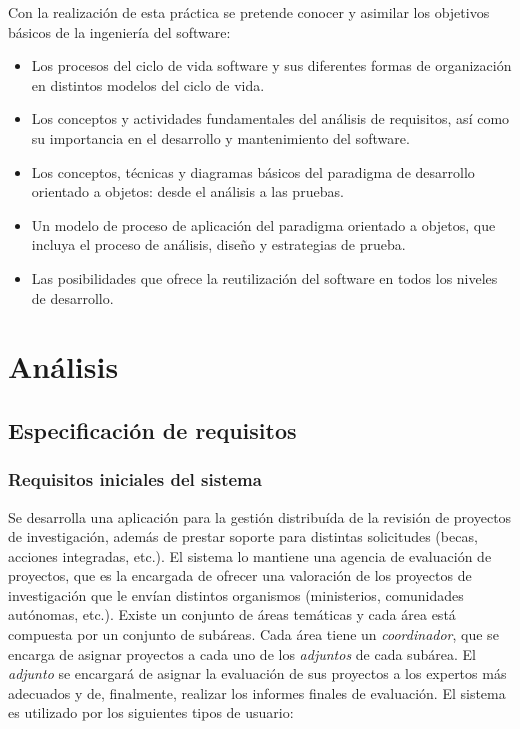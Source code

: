 \documentclass[11pt,a4paper,spanish,twoside]{book}
\begin{document}
Con la realización de esta práctica se pretende conocer y asimilar los
objetivos básicos de la ingeniería del software: 
\begin{itemize}
\item Los procesos del ciclo de vida software y sus diferentes formas de
  organización en distintos modelos del ciclo de vida.
\item Los conceptos y actividades fundamentales del análisis de requisitos,
  así como su importancia en el desarrollo y mantenimiento del software.
\item Los conceptos, técnicas y diagramas básicos del paradigma de desarrollo
  orientado a objetos: desde el análisis a las pruebas.
\item Un modelo de proceso de aplicación del paradigma orientado a objetos, que
  incluya el proceso de análisis, diseño y estrategias de prueba.
\item Las posibilidades que ofrece la reutilización del software en todos los
  niveles de desarrollo.
\end{itemize}

\part{Análisis}
\chapter{Especificación de requisitos}
\section{Requisitos iniciales del sistema}
Se desarrolla una aplicación para la gestión distribuída de la
revisión de proyectos de investigación, además de prestar soporte para
distintas solicitudes (becas, acciones integradas, etc.). El sistema lo
mantiene una agencia de evaluación de proyectos, que es la encargada
de ofrecer una valoración de los proyectos de investigación que le envían
distintos organismos (ministerios, comunidades autónomas, etc.). Existe un
conjunto de áreas temáticas y cada área está compuesta por un conjunto de
subáreas. Cada área tiene un \emph{coordinador}, que se encarga de asignar
proyectos a cada uno de los \emph{adjuntos} de cada subárea. El
\emph{adjunto} se encargará de asignar la evaluación de sus proyectos a los
expertos más adecuados y de, finalmente, realizar los informes finales de
evaluación. El sistema es utilizado por los siguientes tipos de usuario: 
\end{document}
